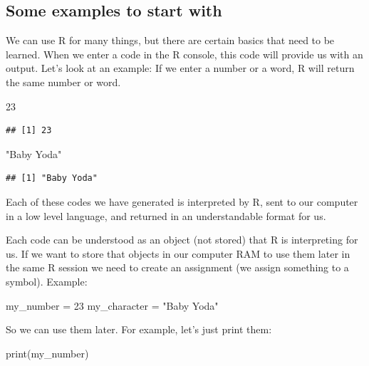 \documentclass[
]{book}
\newenvironment{Shaded}{\begin{snugshade}}{\end{snugshade}}
\newcommand{\DecValTok}[1]{\textcolor[rgb]{0.00,0.00,0.81}{#1}}
\newcommand{\FunctionTok}[1]{\textcolor[rgb]{0.00,0.00,0.00}{#1}}
\newcommand{\NormalTok}[1]{#1}
\newcommand{\OtherTok}[1]{\textcolor[rgb]{0.56,0.35,0.01}{#1}}
\newcommand{\StringTok}[1]{\textcolor[rgb]{0.31,0.60,0.02}{#1}}
\theoremstyle{definition}
\theoremstyle{definition}
\theoremstyle{definition}
\theoremstyle{definition}
\theoremstyle{remark}
\begin{document}
\hypertarget{some-examples-to-start-with}{%
\subsection{Some examples to start with}\label{some-examples-to-start-with}}

We can use R for many things, but there are certain basics that need to be learned. When we enter a code in the R console, this code will provide us with an output. Let's look at an example: If we enter a number or a word, R will return the same number or word.

\begin{Shaded}
\begin{Highlighting}[]
\DecValTok{23}
\end{Highlighting}
\end{Shaded}

\begin{verbatim}
## [1] 23
\end{verbatim}

\begin{Shaded}
\begin{Highlighting}[]
\StringTok{"Baby Yoda"}
\end{Highlighting}
\end{Shaded}

\begin{verbatim}
## [1] "Baby Yoda"
\end{verbatim}

Each of these codes we have generated is interpreted by R, sent to our computer in a low level language, and returned in an understandable format for us.

Each code can be understood as an object (not stored) that R is interpreting for us. If we want to store that objects in our computer RAM to use them later in the same R session we need to create an assignment (we assign something to a symbol). Example:

\begin{Shaded}
\begin{Highlighting}[]
\NormalTok{my\_number }\OtherTok{=} \DecValTok{23}
\NormalTok{my\_character }\OtherTok{=} \StringTok{"Baby Yoda"}
\end{Highlighting}
\end{Shaded}

So we can use them later. For example, let's just print them:

\begin{Shaded}
\begin{Highlighting}[]
\FunctionTok{print}\NormalTok{(my\_number)}
\end{Highlighting}
\end{Shaded}
\end{document}

